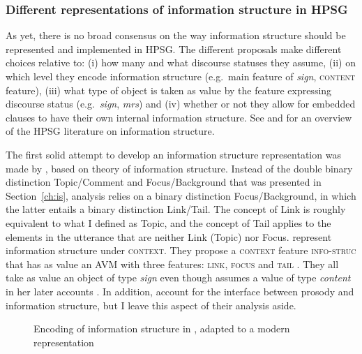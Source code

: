 \subsubsection{Different representations of information structure in HPSG}

As yet, there is no broad consensus on the way information structure should be represented and implemented in HPSG. The different proposals make different choices relative to: (i) how many and what discourse statuses they assume, (ii) on which level they encode information structure (e.g.\ main feature of \emph{sign}, \textsc{content} feature), (iii) what type of object is taken as value by the feature expressing discourse status (e.g.\ \emph{sign}, \emph{mrs}) and (iv) whether or not they allow for embedded clauses to have their own internal information structure. 
See \citet[113--122]{Bildhauer.2008} and \citet{DeKuthy.2020} for an overview of the HPSG literature on information structure.

The first solid attempt to develop an information structure representation was made by \citet{Engdahl.1996}, based on  theory of information structure. Instead of the double binary distinction Topic/Comment and Focus/Background that was presented in Section~\ref{ch:is},  analysis relies on a binary distinction Focus\slash Background, in which the latter entails a binary distinction Link\slash Tail. The concept of Link is roughly equivalent to what I defined as Topic, and the concept of Tail applies to the elements in the utterance that are neither Link (Topic) nor Focus. \citet{Engdahl.1996} represent information structure under \textsc{context}. They propose a \textsc{context} feature \textsc{info-struc} that has as value an AVM
with three features: \textsc{link}, \textsc{focus} and \textsc{tail} \citep[11]{Engdahl.1996}. They all take as value an object of type \emph{sign} even though \citeauthor{Engdahl.1999} assumes a value of type \emph{content} in her later accounts \citep{Engdahl.1999}.  
In addition, \citeauthor{Engdahl.1996} account for the interface between prosody and information structure, but I leave this aspect of their analysis aside.

\begin{figure}[h] 
\caption{Encoding of information structure in \citet[11]{Engdahl.1996}, adapted to a modern representation}
\end{figure}

